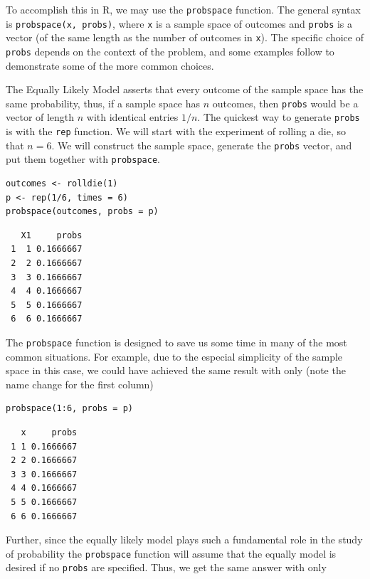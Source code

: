 \documentclass[captions=tableheading]{scrbook}
\begin{document}
To accomplish this in \textsf{R}, we may use the \texttt{probspace} function. The general syntax is \texttt{probspace(x, probs)}, where \texttt{x} is a sample space of outcomes and \texttt{probs} is a vector (of the same length as the number of outcomes in \texttt{x}). The specific choice of \texttt{probs} depends on the context of the problem, and some examples follow to demonstrate some of the more common choices. 

\begin{example}
The Equally Likely Model asserts that every outcome of the sample space has the same probability, thus, if a sample space has \(n\) outcomes, then \texttt{probs} would be a vector of length \(n\) with identical entries \(1/n\). The quickest way to generate \texttt{probs} is with the \texttt{rep} function. We will start with the experiment of rolling a die, so that \(n=6\). We will construct the sample space, generate the \texttt{probs} vector, and put them together with \texttt{probspace}. 


\begin{verbatim}
outcomes <- rolldie(1) 
p <- rep(1/6, times = 6) 
probspace(outcomes, probs = p)
\end{verbatim}

\begin{verbatim}
   X1     probs
 1  1 0.1666667
 2  2 0.1666667
 3  3 0.1666667
 4  4 0.1666667
 5  5 0.1666667
 6  6 0.1666667
\end{verbatim}

The \texttt{probspace} function is designed to save us some time in many of the most common situations. For example, due to the especial simplicity of the sample space in this case, we could have achieved the same result with only (note the name change for the first column) 


\begin{verbatim}
probspace(1:6, probs = p)
\end{verbatim}

\begin{verbatim}
   x     probs
 1 1 0.1666667
 2 2 0.1666667
 3 3 0.1666667
 4 4 0.1666667
 5 5 0.1666667
 6 6 0.1666667
\end{verbatim}

Further, since the equally likely model plays such a fundamental role in the study of probability the \texttt{probspace} function will assume that the equally model is desired if no \texttt{probs} are specified. Thus, we get the same answer with only 



\end{example}
\end{document}
